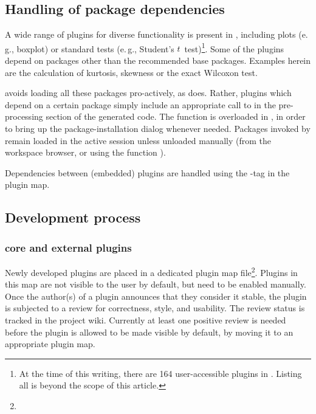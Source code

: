 \documentclass[article,shortnames]{jss}
\begin{document}
\subsection[Handling of R package dependencies]{Handling of  package dependencies}
\label{sec:technical_plugins_dependencies}
A wide range of plugins for diverse functionality is present in ,
including plots (e.\,g., boxplot) or standard tests (e.\,g., Student's $t$~test)\footnote{
  At the time of this writing, there are 164 user-accessible plugins in .
  Listing all is beyond the scope of this article.
}. Some
of the plugins depend on  packages other than the recommended  base packages.
Examples herein are the calculation of kurtosis, skewness or the exact Wilcoxon
test.

 avoids loading all these packages pro-actively, as  does. Rather,
plugins which depend on a certain package simply include an appropriate call to
 in the pre-processing section of the generated  code. The 
function is overloaded in , in order to bring up the package-installation
dialog whenever needed. Packages invoked by  remain loaded
in the active  session unless unloaded manually (from the workspace browser, or using the
 function ).

Dependencies between (embedded) plugins are handled using the -tag in the plugin map.

\subsection{Development process}
\subsubsection[RKWard core and external plugins]{ core and external plugins}
\label{sec:technical_processes_plugins}
Newly developed plugins are placed in a dedicated plugin map file\footnote{
}. Plugins in this map are not visible to the user by default, but need to be enabled manually. Once the
author(s) of a plugin announces that they consider it stable, the plugin is subjected to a review for
correctness, style, and usability. The review status is tracked in the project wiki. Currently at least one
positive review is needed before the plugin is allowed to be made visible by default, by moving it to an
appropriate plugin map.
\end{document}
